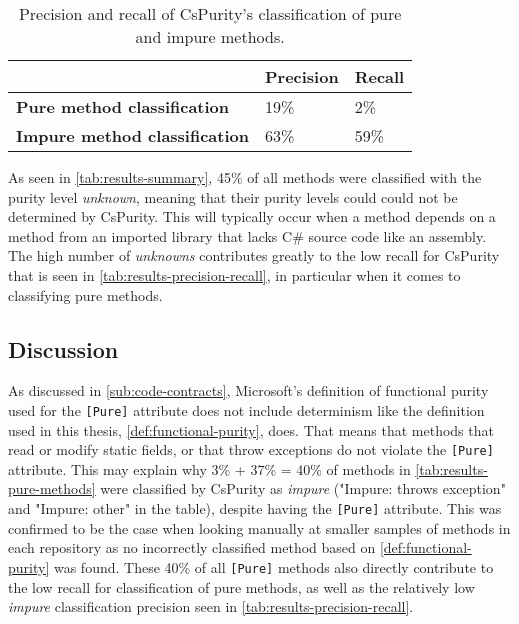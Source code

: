 \documentclass[a4paper,12pt]{article}
\begin{document}
\begin{table}[H]
  \centering
  \caption{Precision and recall of CsPurity's classification of pure and impure methods.}
  \label{tab:results-precision-recall}
  \begin{tabular}{|l|ll|}
    \hline
                                              & \textbf{Precision} & \textbf{Recall} \\
    \hline
    \textbf{Pure method classification}   & 19\%               & 2\%             \\
    \textbf{Impure method classification} & 63\%               & 59\%            \\
    \hline
  \end{tabular}
\end{table}

As seen in \autoref{tab:results-summary}, 45\% of all methods were classified with the purity level \textit{unknown}, meaning that their purity levels could could not be determined by CsPurity. This will typically occur when a method depends on a method from an imported library that lacks C\# source code like an assembly. The high number of \textit{unknowns} contributes greatly to the low recall for CsPurity that is seen in \autoref{tab:results-precision-recall}, in particular when it comes to classifying pure methods.

\subsection{Discussion} \label{sub:discussion}

As discussed in \autoref{sub:code-contracts}, Microsoft's definition of functional purity used for the \texttt{[Pure]} attribute does not include determinism like the definition used in this thesis, \autoref{def:functional-purity}, does. That means that methods that read or modify static fields, or that throw exceptions do not violate the \texttt{[Pure]} attribute. This may explain why 3\% + 37\% = 40\% of methods in \autoref{tab:results-pure-methods} were classified by CsPurity as \textit{impure} ("Impure: throws exception" and "Impure: other" in the table), despite having the \texttt{[Pure]} attribute. This was confirmed to be the case when looking manually at smaller samples of methods in each repository as no incorrectly classified method based on \autoref{def:functional-purity} was found. These 40\% of all \texttt{[Pure]} methods also directly contribute to the low recall for classification of pure methods, as well as the relatively low \textit{impure} classification precision seen in \autoref{tab:results-precision-recall}.
\end{document}
